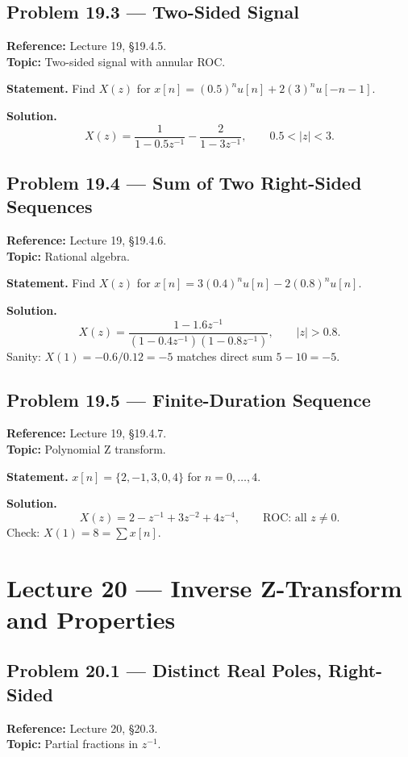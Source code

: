 \documentclass[11pt]{article}
\begin{document}
\subsection{Problem 19.3 --- Two-Sided Signal}
\textbf{Reference:} Lecture 19, \S 19.4.5.\\
\textbf{Topic:} Two-sided signal with annular ROC.

\textbf{Statement.} Find $X(z)$ for $x[n] = (0.5)^n u[n] + 2(3)^n u[-n-1]$.

\textbf{Solution.}
\[
X(z) = \frac{1}{1-0.5z^{-1}} - \frac{2}{1-3z^{-1}},\qquad 0.5<|z|<3.
\]

\subsection{Problem 19.4 --- Sum of Two Right-Sided Sequences}
\textbf{Reference:} Lecture 19, \S 19.4.6.\\
\textbf{Topic:} Rational algebra.

\textbf{Statement.} Find $X(z)$ for $x[n]=3(0.4)^n u[n] - 2(0.8)^n u[n]$.

\textbf{Solution.}
\[
X(z) = \frac{1-1.6z^{-1}}{(1-0.4z^{-1})(1-0.8z^{-1})},\qquad |z|>0.8.
\]
Sanity: $X(1) = -0.6/0.12 = -5$ matches direct sum $5-10=-5$.

\subsection{Problem 19.5 --- Finite-Duration Sequence}
\textbf{Reference:} Lecture 19, \S 19.4.7.\\
\textbf{Topic:} Polynomial Z transform.

\textbf{Statement.} $x[n] = \{2,-1,3,0,4\}$ for $n=0,\ldots,4$.

\textbf{Solution.}
\[
X(z) = 2 - z^{-1}+3z^{-2}+4z^{-4},\qquad \text{ROC: all }z\neq 0.
\]
Check: $X(1) = 8 = \sum x[n]$.

\section{Lecture 20 --- Inverse Z-Transform and Properties}

\subsection{Problem 20.1 --- Distinct Real Poles, Right-Sided}
\textbf{Reference:} Lecture 20, \S 20.3.\\
\textbf{Topic:} Partial fractions in $z^{-1}$.
\end{document}
